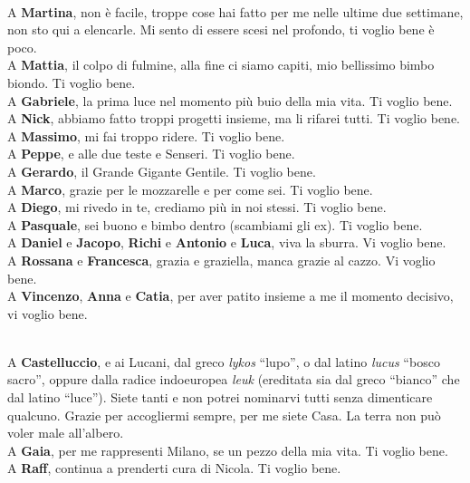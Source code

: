 \documentclass[main]{subfiles}
\begin{document}
\noindent\\
A \textbf{Martina}, non è facile, troppe cose hai fatto per me nelle ultime due settimane, non sto qui a elencarle.
Mi sento di essere scesi nel profondo, ti voglio bene è poco.
\noindent\\
A \textbf{Mattia}, il colpo di fulmine, alla fine ci siamo capiti, mio bellissimo bimbo biondo. Ti voglio bene.
\noindent\\
A \textbf{Gabriele}, la prima luce nel momento più buio della mia vita. Ti voglio bene.
\noindent\\
A \textbf{Nick}, abbiamo fatto troppi progetti insieme, ma li rifarei tutti. Ti voglio bene.
\noindent\\
A \textbf{Massimo}, mi fai troppo ridere. Ti voglio bene.
\noindent\\
A \textbf{Peppe}, e alle due teste e Senseri. Ti voglio bene.
\noindent\\
A \textbf{Gerardo}, il Grande Gigante Gentile. Ti voglio bene.
\noindent\\
A \textbf{Marco}, grazie per le mozzarelle e per come sei. Ti voglio bene.
\noindent\\
A \textbf{Diego}, mi rivedo in te, crediamo più in noi stessi. Ti voglio bene.
\noindent\\
A \textbf{Pasquale}, sei buono e bimbo dentro (scambiami gli ex). Ti voglio bene.
\noindent\\ 
A \textbf{Daniel} e \textbf{Jacopo}, \textbf{Richi} e \textbf{Antonio} e \textbf{Luca},
viva la sburra. Vi voglio bene.
\noindent\\
A \textbf{Rossana} e \textbf{Francesca}, grazia e graziella, manca grazie al cazzo. Vi voglio bene.
\noindent\\
A \textbf{Vincenzo}, \textbf{Anna} e \textbf{Catia}, per aver patito insieme a me
il momento decisivo, vi voglio bene.

\noindent\\
A \textbf{Castelluccio}, e ai Lucani, dal greco \textit{lykos} ``lupo'',  
o dal latino \textit{lucus} ``bosco sacro'', oppure dalla radice indoeuropea \textit{leuk}  
(ereditata sia dal greco ``bianco'' che dal latino ``luce'').  
Siete tanti e non potrei nominarvi tutti senza dimenticare qualcuno.  
Grazie per accogliermi sempre, per me siete Casa.  
La terra non può voler male all’albero.
\noindent\\
A \textbf{Gaia}, per me rappresenti Milano, se un pezzo della mia vita. Ti voglio bene.
\noindent\\
A \textbf{Raff}, continua a prenderti cura di Nicola. Ti voglio bene.
\end{document}
